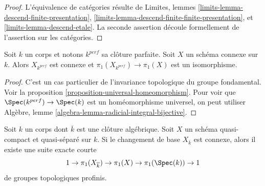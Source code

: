 \begin{proof}
L'équivalence de catégories résulte de Limites, lemmes
\ref{limits-lemma-descend-finite-presentation},
\ref{limits-lemma-descend-finite-finite-presentation}, et
\ref{limits-lemma-descend-etale}.
La seconde assertion découle formellement de l'assertion sur les
catégories.
\end{proof}

\begin{lemma}
\label{lemma-perfection}
Soit $k$ un corps et notons $k^{perf}$ sa clôture parfaite. Soit $X$ un schéma connexe
sur $k$. Alors $X_{k^{perf}}$ est connexe et
$\pi_1(X_{k^{perf}}) \to \pi_1(X)$ est un isomorphisme.
\end{lemma}

\begin{proof}
C'est un cas particulier de l'invariance topologique du groupe fondamental.
Voir la proposition \ref{proposition-universal-homeomorphism}.
Pour voir que $\Spec(k^{perf}) \to \Spec(k)$ est un
homéomorphisme universel, on peut utiliser
Algèbre, lemme \ref{algebra-lemma-radicial-integral-bijective}.
\end{proof}

\begin{lemma}
\label{lemma-ses-field}
Soit $k$ un corps dont $\overline{k}$ est une clôture algébrique.
Soit $X$ un schéma quasi-compact et quasi-séparé sur $k$.
Si le changement de base $X_{\overline{k}}$ est connexe, alors
il existe une suite exacte courte
$$
1 \to \pi_1(X_{\overline{k}}) \to \pi_1(X) \to \pi_1(\Spec(k)) \to 1
$$
de groupes topologiques profinis.
\end{lemma}

